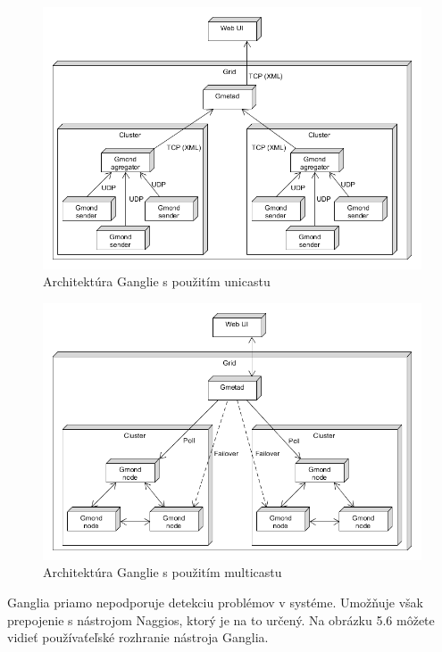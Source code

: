 \documentclass[a4paper, upjsfrontpage, disablespecwarning, thesismargins, thesislinespacing]{rnthesis}
\begin{document}
\begin{figure}
	\begin{center}
		\includegraphics[scale=0.55]{ganglia-architecture.png}
	\end{center}
	\caption{Architektúra Ganglie s použitím unicastu}
\end{figure}

\begin{figure}
	\begin{center}
		\includegraphics[scale=0.55]{ganglia-architecture-multicast.png}
	\end{center}
	\caption{Architektúra Ganglie s použitím multicastu}
\end{figure}


Ganglia priamo nepodporuje detekciu problémov v systéme.
Umožňuje však prepojenie s nástrojom Naggios, ktorý je na to určený.
Na obrázku 5.6 môžete vidieť používaťeľské rozhranie nástroja Ganglia.
\end{document}
